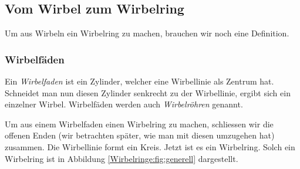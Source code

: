 \subsection{Vom Wirbel zum Wirbelring}

Um aus Wirbeln ein Wirbelring zu machen, brauchen wir noch eine Definition.

\subsubsection*{Wirbelfäden}

Ein {\em Wirbelfaden} ist ein Zylinder, welcher eine Wirbellinie als Zentrum hat.
Schneidet man nun diesen Zylinder senkrecht zu der Wirbellinie, ergibt sich ein einzelner Wirbel.
Wirbelfäden werden auch {\em Wirbelröhren} genannt.

Um aus einem Wirbelfaden einen Wirbelring zu machen, schliessen wir die offenen Enden (wir betrachten später, wie man mit diesen umzugehen hat) zusammen.
Die Wirbellinie formt ein Kreis.
Jetzt ist es ein Wirbelring. 
Solch ein Wirbelring ist in Abbildung \ref{Wirbelringe:fig:generell} dargestellt.


